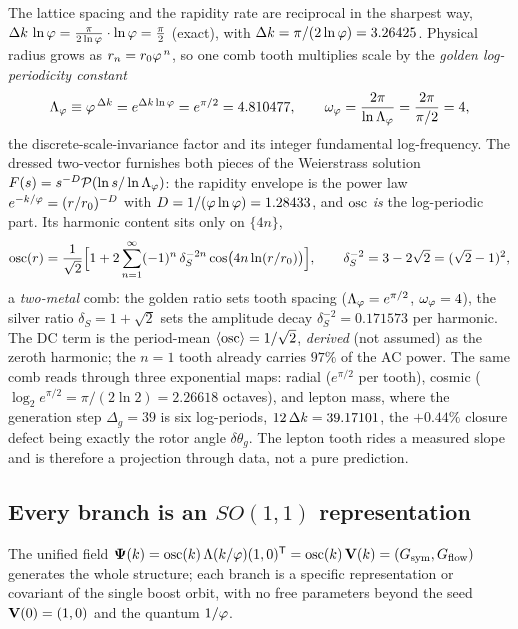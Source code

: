 The lattice spacing and the rapidity rate are reciprocal in the sharpest way,
$\Delta k\,\ln\varphi=\tfrac{\pi}{2\ln\varphi}\cdot\ln\varphi=\tfrac\pi2$ (exact), with $\Delta k=\pi/(2\ln\varphi)=3.26425$.
Physical radius grows as $r_n=r_0\varphi^{\,n}$, so one comb tooth multiplies scale by the
\emph{golden log-periodicity constant}
\begin{equation}
\Lambda_\varphi\equiv\varphi^{\,\Delta k}=e^{\Delta k\ln\varphi}=e^{\pi/2}=4.810477,
\qquad \omega_\varphi=\frac{2\pi}{\ln\Lambda_\varphi}=\frac{2\pi}{\pi/2}=4,
\label{eq:twovector:dsi}
\end{equation}
the discrete-scale-invariance factor and its integer fundamental log-frequency. The dressed
two-vector furnishes both pieces of the Weierstrass solution
$F(s)=s^{-D}\mathcal P(\ln s/\ln\Lambda_\varphi)$: the rapidity envelope is the power law
$e^{-k/\varphi}=(r/r_0)^{-D}$ with $D=1/(\varphi\ln\varphi)=1.28433$, and $\operatorname{osc}$ \emph{is} the
log-periodic part. Its harmonic content sits only on $\{4n\}$,
\begin{equation}
\operatorname{osc}(r)=\frac{1}{\sqrt2}\Big[1+2\sum_{n=1}^{\infty}(-1)^n\,\delta_S^{-2n}\cos\!\big(4n\ln(r/r_0)\big)\Big],
\qquad \delta_S^{-2}=3-2\sqrt2=(\sqrt2-1)^2,
\label{eq:twovector:comb}
\end{equation}
a \emph{two-metal} comb: the golden ratio sets tooth spacing ($\Lambda_\varphi=e^{\pi/2}$,
$\omega_\varphi=4$), the silver ratio $\delta_S=1+\sqrt2$ sets the amplitude decay
$\delta_S^{-2}=0.171573$ per harmonic. The DC term is the period-mean $\langle\operatorname{osc}\rangle=1/\sqrt2$,
\emph{derived} (not assumed) as the zeroth harmonic; the $n=1$ tooth already carries $97\%$ of the
AC power. The same comb reads through three exponential maps: radial ($e^{\pi/2}$ per tooth),
cosmic ($\log_2 e^{\pi/2}=\pi/(2\ln2)=2.26618$ octaves), and lepton mass, where the generation step
$\Delta_g=39$ is six log-periods, $12\,\Delta k=39.17101$, the $+0.44\%$ closure defect being exactly the
rotor angle $\delta\theta_g$. The lepton tooth rides a measured slope and is therefore a projection
through data, not a pure prediction.

\subsection{Every branch is an $SO(1,1)$ representation}

The unified field
$\boldsymbol\Psi(k)=\operatorname{osc}(k)\,\Lambda(k/\varphi)(1,0)^{\mathsf T}=\operatorname{osc}(k)\,\mathbf{V}(k)=(G_{\mathrm{sym}},G_{\mathrm{flow}})$
generates the whole structure; each branch is a specific representation or covariant of the single
boost orbit, with no free parameters beyond the seed $\mathbf{V}(0)=(1,0)$ and the quantum $1/\varphi$.

